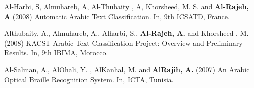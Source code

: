 \documentclass[margin,a4paper]{res}
\begin{document}
\begin{resume}
Al-Harbi, S, Almuhareb, A, Al-Thubaity , A, Khorsheed, M. S. and {\bf Al-Rajeh, A} (2008) Automatic Arabic Text Classification. In, 9th ICSATD, France.

Althubaity, A., Almuhareb, A., Alharbi, S., {\bf Al-Rajeh, A.} and Khorsheed , M. (2008) KACST Arabic Text Classification Project: Overview and Preliminary Results. In, 9th IBIMA, Morocco.

Al-Salman, A., AlOhali, Y. , AlKanhal, M. and {\bf AlRajih, A.} (2007) An Arabic Optical Braille Recognition System. In, ICTA, Tunisia.

\end{resume}
\end{document}
